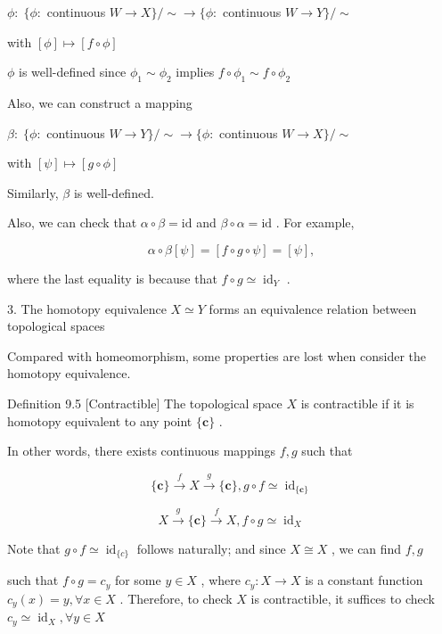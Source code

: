 \(\phi  : \;\{ \phi  :\) continuous \(W \rightarrow  X\} / \sim   \rightarrow  \{ \phi  :\) continuous \(W \rightarrow  Y\} / \sim\)

with \(\left\lbrack  \phi \right\rbrack   \mapsto  \left\lbrack  {f \circ  \phi }\right\rbrack\)

\(\phi\) is well-defined since \({\phi }_{1} \sim  {\phi }_{2}\) implies \(f \circ  {\phi }_{1} \sim  f \circ  {\phi }_{2}\)

Also, we can construct a mapping

\(\beta  : \;\{ \phi  :\) continuous \(W \rightarrow  Y\} / \sim   \rightarrow  \{ \phi  :\) continuous \(W \rightarrow  X\} / \sim\)

with \(\left\lbrack  \psi \right\rbrack   \mapsto  \left\lbrack  {g \circ  \phi }\right\rbrack\)

Similarly, \(\beta\) is well-defined.

Also, we can check that \(\alpha  \circ  \beta  = \mathrm{{id}}\) and \(\beta  \circ  \alpha  = \mathrm{{id}}\) . For example,

\[
\alpha  \circ  \beta \left\lbrack  \psi \right\rbrack   = \left\lbrack  {f \circ  g \circ  \psi }\right\rbrack   = \left\lbrack  \psi \right\rbrack  ,
\]

where the last equality is because that \(f \circ  g \simeq  {\operatorname{id}}_{Y}\) .

3. The homotopy equivalence \(X \simeq  Y\) forms an equivalence relation between topological spaces

Compared with homeomorphism, some properties are lost when consider the homotopy equivalence.

Definition 9.5 [Contractible] The topological space \(X\) is contractible if it is homotopy equivalent to any point \(\{ \mathbf{c}\}\) .

In other words, there exists continuous mappings \(f,g\) such that

\[
\{ \mathbf{c}\} \overset{f}{ \rightarrow  }X\overset{g}{ \rightarrow  }\{ \mathbf{c}\} ,g \circ  f \simeq  {\operatorname{id}}_{\{ \mathbf{c}\} }
\]

\[
X\overset{g}{ \rightarrow  }\{ \mathbf{c}\} \overset{f}{ \rightarrow  }X,f \circ  g \simeq  {\operatorname{id}}_{X}
\]

Note that \(g \circ  f \simeq  {\operatorname{id}}_{\{ c\} }\) follows naturally; and since \(X \cong  X\) , we can find \(f,g\)

such that \(f \circ  g = {c}_{y}\) for some \(y \in  X\) , where \({c}_{y} : X \rightarrow  X\) is a constant function \({c}_{y}\left( x\right)  = y,\forall x \in  X\) . Therefore, to check \(X\) is contractible, it suffices to check \({c}_{y} \simeq  {\operatorname{id}}_{X},\forall y \in  X\)


